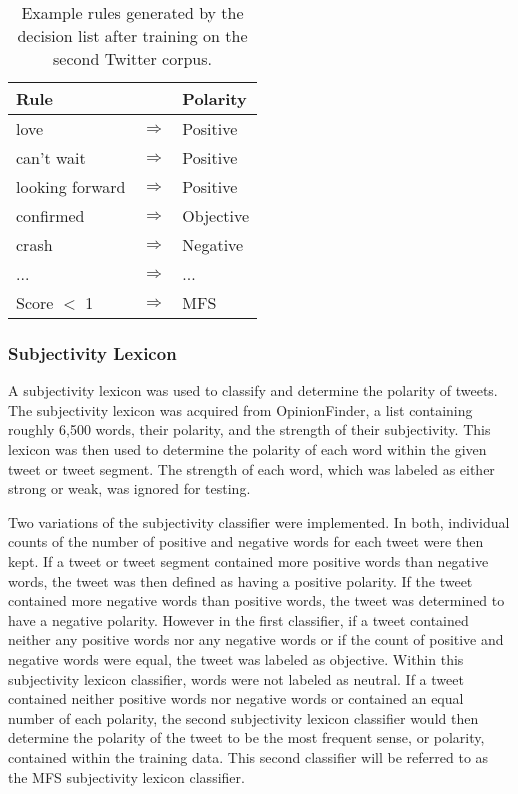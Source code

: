 \documentclass[11pt]{article}
\begin{document}
\begin{table}[H]
  \begin{center}
  \begin{tabular}{| p{3cm} l l |}
  \hline
  Rule & & Polarity \\ \hline
  love & $\Rightarrow$ & Positive \\
  can't wait & $\Rightarrow$ & Positive \\
  looking forward & $\Rightarrow$ & Positive \\
  confirmed & $\Rightarrow$ & Objective \\
  crash & $\Rightarrow$ & Negative \\
  ... & $\Rightarrow$ & ... \\
  Score $<$ 1 & $\Rightarrow$ & MFS \\ \hline
  \end{tabular}
  \end{center}
  \caption{Example rules generated by the decision list after training on the second Twitter corpus.}
\end{table}

\subsubsection*{Subjectivity Lexicon}
A subjectivity lexicon was used to classify and determine the polarity of tweets. The subjectivity lexicon was acquired from OpinionFinder, a list containing roughly 6,500 words, their polarity, and the strength of their subjectivity. This lexicon was then used to determine the polarity of each word within the given tweet or tweet segment. The strength of each word, which was labeled as either strong or weak, was ignored for testing.

\indent Two variations of the subjectivity classifier were implemented. In both, individual counts of the number of positive and negative words for each tweet were then kept. If a tweet or tweet segment contained more positive words than negative words, the tweet was then defined as having a positive polarity. If the tweet contained more negative words than positive words, the tweet was determined to have a negative polarity. However in the first classifier, if a tweet contained neither any positive words nor any negative words or if the count of positive and negative words were equal, the tweet was labeled as objective. Within this subjectivity lexicon classifier, words were not labeled as neutral. If a tweet contained neither positive words nor negative words or contained an equal number of each polarity, the second subjectivity lexicon classifier would then determine the polarity of the tweet to be the most frequent sense, or polarity, contained within the training data. This second classifier will be referred to as the MFS subjectivity lexicon classifier.
\end{document}
